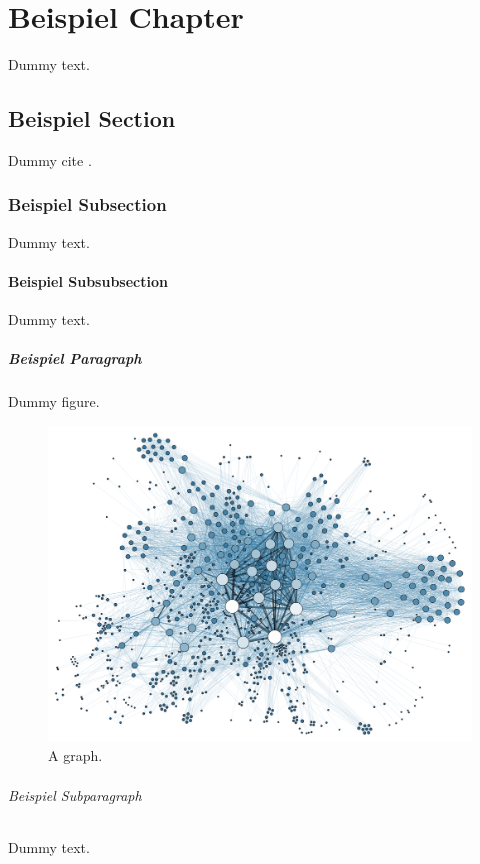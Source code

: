 \chapter{Beispiel  Chapter}

Dummy text.

\section{Beispiel Section}

Dummy cite \cite{bringhurst1996ets}.

\subsection{Beispiel Subsection}

Dummy text.

\subsubsection{Beispiel Subsubsection}

Dummy text.

\paragraph{Beispiel Paragraph}

Dummy figure.

\begin{figure}[H]
    \includegraphics[width=\linewidth]{resources/gephi.png}
    \caption{A graph.}
    \label{fig:graph1}
\end{figure}


\subparagraph{Beispiel Subparagraph}

Dummy text.
